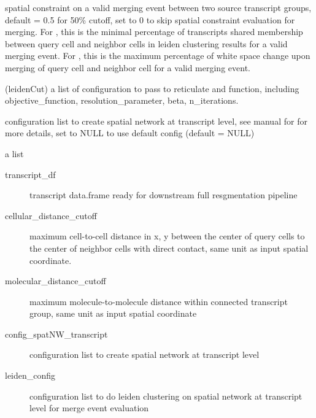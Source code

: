 \documentclass[letterpaper]{book}
\begin{document}
\begin{Arguments}
\begin{ldescription}
\item[\code{cutoff\_spatialMerge}] spatial constraint on a valid merging event between two source transcript groups, default = 0.5 for 50\% cutoff, set to 0 to skip spatial constraint evaluation for merging.
For , this is the minimal percentage of transcripts shared membership between query cell and neighbor cells in leiden clustering results for a valid merging event.
For , this is the maximum percentage of white space change upon merging of query cell and neighbor cell for a valid merging event.

\item[\code{leiden\_config}] (leidenCut) a list of configuration to pass to reticulate and  function, including objective\_function, resolution\_parameter, beta, n\_iterations.

\item[\code{config\_spatNW\_transcript}] configuration list to create spatial network at transcript level, see manual for  for more details, set to NULL to use default config (default = NULL)
\end{ldescription}
\end{Arguments}
%
\begin{Value}
a list
\begin{description}

\item[transcript\_df] transcript data.frame ready for downstream full resgmentation pipeline
\item[cellular\_distance\_cutoff] maximum cell-to-cell distance in x, y between the center of query cells to the center of neighbor cells with direct contact, same unit as input spatial coordinate.
\item[molecular\_distance\_cutoff] maximum molecule-to-molecule distance within connected transcript group, same unit as input spatial coordinate
\item[config\_spatNW\_transcript] configuration list to create spatial network at transcript level
\item[leiden\_config] configuration list to do leiden clustering on spatial network at transcript level for merge event evaluation

\end{description}

\end{Value}
\end{document}
